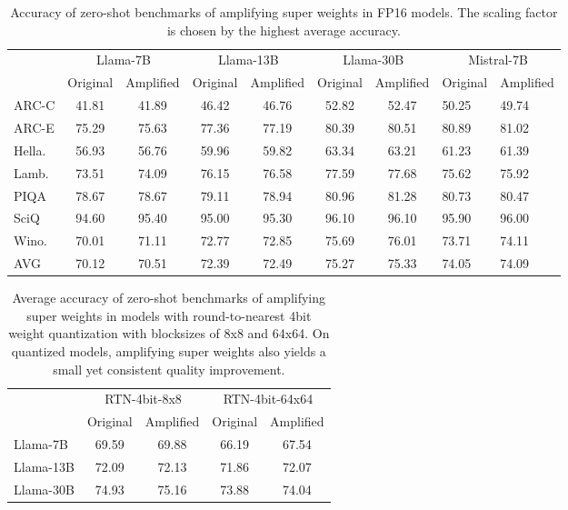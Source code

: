 \documentclass{article} %
\begin{document}
\begin{table}[htb]
\centering
\small
\begin{tabular}{@{}lcccccc@{}ll}
\toprule
 & \multicolumn{2}{c}{Llama-7B}& \multicolumn{2}{c}{Llama-13B}& \multicolumn{2}{c}{Llama-30B}& \multicolumn{2}{c}{Mistral-7B}\\ 
 \cmidrule(lr){2-3} \cmidrule(lr){4-5} \cmidrule(lr){6-7} \cmidrule(lr){8-9}
 & Original & Amplified & Original & Amplified & Original & Amplified  & Original &Amplified \\
 \midrule

ARC-C & 41.81 & 41.89 & 46.42 & 46.76 & 52.82 & 52.47  & 50.25 &49.74 \\
ARC-E & 75.29 & 75.63 & 77.36 & 77.19 & 80.39 & 80.51  & 80.89 &81.02 \\
Hella. & 56.93 & 56.76 & 59.96 & 59.82 & 63.34 & 63.21  & 61.23 &61.39 \\
Lamb. & 73.51 & 74.09 & 76.15 & 76.58 & 77.59 & 77.68  & 75.62 &75.92 \\
PIQA & 78.67 & 78.67 & 79.11 & 78.94 & 80.96 & 81.28  & 80.73 &80.47 \\
SciQ & 94.60 & 95.40 & 95.00 & 95.30 & 96.10 & 96.10  & 95.90 &96.00 \\
Wino. & 70.01 & 71.11 & 72.77 & 72.85 & 75.69 & 76.01  & 73.71 &74.11 \\
\midrule
AVG & 70.12 & 70.51 & 72.39 & 72.49 & 75.27 & 75.33  & 74.05 &74.09 \\ \bottomrule
\end{tabular}%

\caption{Accuracy of zero-shot benchmarks of amplifying super weights in FP16 models. The scaling factor is chosen by the highest average accuracy. }
\label{tab:result_amplify_sw_fp16}
\end{table}


\begin{table}[htb]
\centering
\small
\begin{tabular}{@{}lcccc@{}}
\toprule
 & \multicolumn{2}{c}{RTN-4bit-8x8} & \multicolumn{2}{c}{RTN-4bit-64x64} \\ \cmidrule(lr){2-3}  \cmidrule(lr){4-5}
 & Original & Amplified & Original & Amplified \\ \midrule
Llama-7B & 69.59 & 69.88 & 66.19 & 67.54 \\
Llama-13B & 72.09 & 72.13 & 71.86 & 72.07 \\
Llama-30B & 74.93 & 75.16 & 73.88 & 74.04 \\ \bottomrule
\end{tabular}%


\caption{Average accuracy of zero-shot benchmarks of amplifying super weights in models with round-to-nearest 4bit weight quantization with blocksizes of 8x8 and 64x64. On quantized models, amplifying super weights also yields a small yet consistent quality improvement.}
\label{tab:result_amplify_sw_int4}
\end{table}
\end{document}
